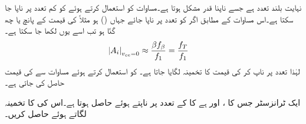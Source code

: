  نہایت بلند تعدد ہے جسے ناپنا قدر مشکل ہوتا ہے۔مساوات  کو استعمال کرتے ہوئے  کو کم تعدد پر ناپا جا سکتا ہے۔اس مساوات کے مطابق اگر  کو تعدد  پر ناپا جائے جہاں () ہو مثلاً  کی قیمت  کے پانچ یا چھ گنّا ہو تب اسے یوں لکھا جا سکتا ہے۔
\begin{align} \label{مساوات_تعددی_ردعمل_کسر_دور_انقطاعی_تعدد_تخمینہ}
\abs{A_i}_{v_{ce}=0}& \approx \frac{\beta f_{\beta}}{f_1}=\frac{f_T}{f_1}
\end{align}
لہٰذا  تعدد پر  ناپ کر  کی قیمت کا تخمینہ لگایا جاتا ہے۔ کو استعمال کرتے ہوئے مساوات  سے   کی قیمت حاصل کی جاتی ہے۔

ایک ٹرانزسٹر جس کا ، اور  ہے کا  کے تعدد  پر  ناپتے ہوئے حاصل ہوتا ہے۔اس کی  کا تخمینہ لگاتے ہوئے  حاصل کریں۔

